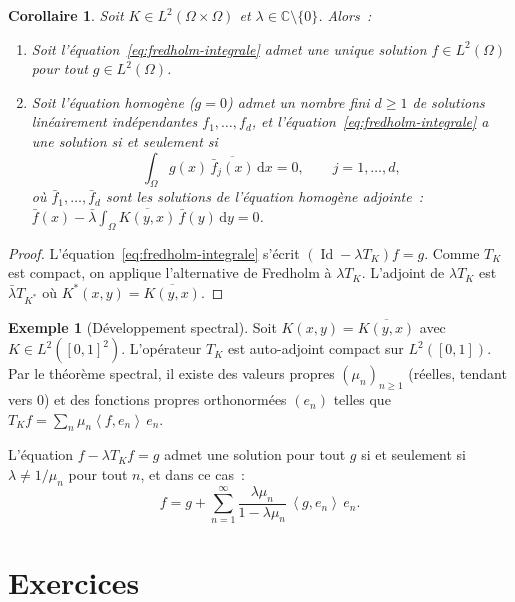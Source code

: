 \documentclass[a4paper,12pt]{book}
\DeclareMathOperator{\Id}{Id}
\newcommand{\C}{\mathbb{C}}
\newcommand{\dd}{\mathrm{d}}
\newcommand{\inner}[2]{\left\langle #1, #2 \right\rangle}
\theoremstyle{definition}
\newtheorem{exemple}[definition]{Exemple}
\theoremstyle{plain}
\newtheorem{corollaire}[definition]{Corollaire}
\theoremstyle{remark}
\begin{document}
\begin{corollaire}
\label{cor:fredholm-integrale}
Soit $K \in L^2(\Omega \times \Omega)$ et $\lambda \in \C \setminus \{0\}$.
Alors~:
\begin{enumerate}[label=(\roman*)]
  \item Soit l'équation~\eqref{eq:fredholm-integrale} admet une unique solution
        $f \in L^2(\Omega)$ pour tout $g \in L^2(\Omega)$.
  \item Soit l'équation homogène ($g = 0$) admet un nombre fini $d \ge 1$ de solutions
        linéairement indépendantes $f_1, \ldots, f_d$, et
        l'équation~\eqref{eq:fredholm-integrale} a une solution si et seulement si
        \[
          \int_\Omega g(x)\,\overline{\bar f_j(x)}\,\dd x = 0,
          \qquad j = 1, \ldots, d,
        \]
        où $\bar f_1, \ldots, \bar f_d$ sont les solutions de l'équation homogène
        adjointe~:
        $\bar f(x) - \bar\lambda \int_\Omega \overline{K(y,x)}\,\bar f(y)\,\dd y = 0$.
\end{enumerate}
\end{corollaire}

\begin{proof}
L'équation~\eqref{eq:fredholm-integrale} s'écrit $(\Id - \lambda T_K)f = g$. Comme
$T_K$ est compact, on applique l'alternative de Fredholm à $\lambda T_K$. L'adjoint de
$\lambda T_K$ est $\bar\lambda T_{K^*}$ où $K^*(x,y) = \overline{K(y,x)}$.
\end{proof}

\begin{exemple}[Développement spectral]
\label{ex:fredholm-sym}
Soit $K(x,y) = \overline{K(y,x)}$ avec $K \in L^2([0,1]^2)$. L'opérateur $T_K$ est
auto-adjoint compact sur $L^2([0,1])$. Par le théorème spectral, il existe des valeurs
propres $(\mu_n)_{n \ge 1}$ (réelles, tendant vers $0$) et des fonctions propres
orthonormées $(e_n)$ telles que $T_K f = \sum_n \mu_n \inner{f}{e_n}\,e_n$.

L'équation $f - \lambda T_K f = g$ admet une solution pour tout $g$ si et seulement si
$\lambda \neq 1/\mu_n$ pour tout $n$, et dans ce cas~:
\[
  f = g + \sum_{n=1}^\infty \frac{\lambda \mu_n}{1 - \lambda \mu_n}\,
    \inner{g}{e_n}\, e_n.
\]
\end{exemple}

\section{Exercices}
\end{document}
